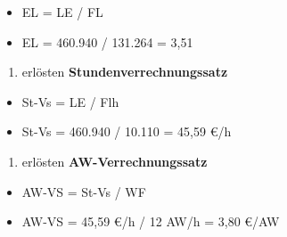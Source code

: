 \begin{itemize}
\item
  EL = LE / FL
\item
  EL = 460.940 / 131.264 = 3,51
\end{itemize}

\begin{enumerate}
\def\labelenumi{\alph{enumi})}
\setcounter{enumi}{2}
\item
  erlösten \textbf{Stundenverrechnungssatz}
\end{enumerate}

\begin{itemize}
\item
  St-Vs = LE / Flh
\item
  St-Vs = 460.940 / 10.110 = 45,59 €/h
\end{itemize}

\begin{enumerate}
\def\labelenumi{\alph{enumi})}
\setcounter{enumi}{3}
\item
  erlösten \textbf{AW-Verrechnungssatz}
\end{enumerate}

\begin{itemize}
\item
  AW-VS = St-Vs / WF
\item
  AW-VS = 45,59 €/h / 12 AW/h = 3,80 €/AW
\end{itemize}

